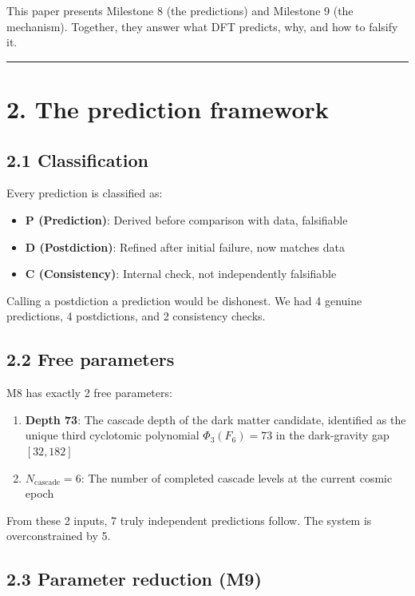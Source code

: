 \documentclass[11pt,a4paper]{article}
\providecommand{\tightlist}{\setlength{\itemsep}{0pt}\setlength{\parskip}{0pt}}
\begin{document}
This paper presents Milestone 8 (the predictions) and Milestone 9 (the mechanism). Together, they answer what DFT predicts, why, and how to falsify it.

\begin{center}\rule{0.5\linewidth}{0.4pt}\end{center}

\section*{2. The prediction framework}

\subsection*{2.1 Classification}

Every prediction is classified as:
\begin{itemize}\tightlist
\item \textbf{P (Prediction)}: Derived before comparison with data, falsifiable
\item \textbf{D (Postdiction)}: Refined after initial failure, now matches data
\item \textbf{C (Consistency)}: Internal check, not independently falsifiable
\end{itemize}

Calling a postdiction a prediction would be dishonest. We had 4 genuine predictions, 4 postdictions, and 2 consistency checks.

\subsection*{2.2 Free parameters}

M8 has exactly 2 free parameters:
\begin{enumerate}\tightlist
\item \textbf{Depth 73}: The cascade depth of the dark matter candidate, identified as the unique third cyclotomic polynomial $\Phi_3(F_6) = 73$ in the dark-gravity gap $[32, 182]$
\item \textbf{$N_{\text{cascade}} = 6$}: The number of completed cascade levels at the current cosmic epoch
\end{enumerate}

From these 2 inputs, 7 truly independent predictions follow. The system is overconstrained by 5.

\subsection*{2.3 Parameter reduction (M9)}
\end{document}
